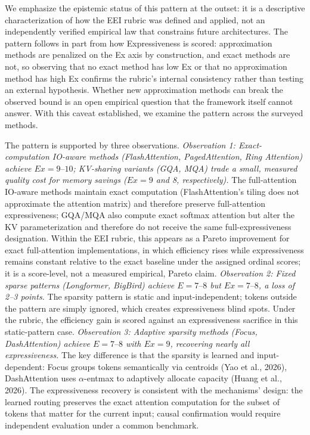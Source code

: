 \documentclass[10pt,twocolumn]{article}
\begin{document}
We emphasize the epistemic status of this pattern at the outset: it is a descriptive characterization of how the EEI rubric was defined and applied, not an independently verified empirical law that constrains future architectures. The pattern follows in part from how Expressiveness is scored: approximation methods are penalized on the Ex axis by construction, and exact methods are not, so observing that no exact method has low Ex or that no approximation method has high Ex confirms the rubric's internal consistency rather than testing an external hypothesis. Whether new approximation methods can break the observed bound is an open empirical question that the framework itself cannot answer. With this caveat established, we examine the pattern across the surveyed methods.

The pattern is supported by three observations. \textit{Observation 1: Exact-computation IO-aware methods (FlashAttention, PagedAttention, Ring Attention) achieve $Ex = 9\text{--}10$; KV-sharing variants (GQA, MQA) trade a small, measured quality cost for memory savings ($Ex = 9$ and 8, respectively).} The full-attention IO-aware methods maintain exact computation (FlashAttention's tiling does not approximate the attention matrix) and therefore preserve full-attention expressiveness; GQA/MQA also compute exact softmax attention but alter the KV parameterization and therefore do not receive the same full-expressiveness designation. Within the EEI rubric, this appears as a Pareto improvement for exact full-attention implementations, in which efficiency rises while expressiveness remains constant relative to the exact baseline under the assigned ordinal scores; it is a score-level, not a measured empirical, Pareto claim. \textit{Observation 2: Fixed sparse patterns (Longformer, BigBird) achieve $E = 7\text{--}8$ but $Ex = 7\text{--}8$, a loss of 2--3 points.} The sparsity pattern is static and input-independent; tokens outside the pattern are simply ignored, which creates expressiveness blind spots. Under the rubric, the efficiency gain is scored against an expressiveness sacrifice in this static-pattern case. \textit{Observation 3: Adaptive sparsity methods (Focus, DashAttention) achieve $E = 7\text{--}8$ with $Ex = 9$, recovering nearly all expressiveness.} The key difference is that the sparsity is learned and input-dependent: Focus groups tokens semantically via centroids (Yao et al., 2026), DashAttention uses $\alpha$-entmax to adaptively allocate capacity (Huang et al., 2026). The expressiveness recovery is consistent with the mechanisms' design: the learned routing preserves the exact attention computation for the subset of tokens that matter for the current input; causal confirmation would require independent evaluation under a common benchmark.
\end{document}

